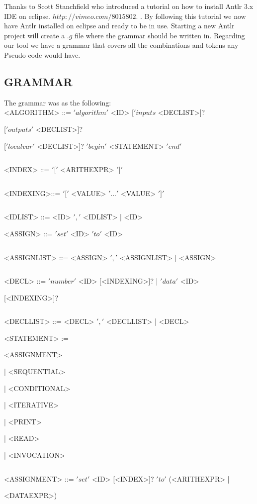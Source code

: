 \documentclass[a4paper]{article}
\begin{document}
Thanks to Scott Stanchfield who introduced a tutorial on how to install Antlr 3.x IDE on eclipse.
$ http://vimeo.com/8015802 $.  
.
By following this tutorial we now have Antlr installed on eclipse and ready to be in use.
Starting a new Antlr project will create a $.g$ file where the grammar should be written in. Regarding our tool we have a grammar that covers all the combinations and tokens any Pseudo code would have.
\subsection{GRAMMAR}
The grammar was as the following:
$$ $$
<ALGORITHM>      ::= $'algorithm' $ <ID> [$ 'inputs$ <DECLIST>]? \newline \centerline{
[$'outputs'$ <DECLIST>]?} \newline \centerline {[$'localvar'$ <DECLIST>]? $'begin'$ <STATEMENT> $'end'$ }

$$ $$

<INDEX>   ::= $'['$ <ARITHEXPR> $']'$

$$ $$

<INDEXING>::= $'['$ <VALUE> $'...'$ <VALUE> $']'$

$$ $$ 

<IDLIST> ::=  <ID> $','$ <IDLIST> | <ID>
$$ $$ 

<ASSIGN>  ::= $'set'$ <ID> $'to'$ <ID>

$$ $$

<ASSIGNLIST> ::= <ASSIGN> $','$ <ASSIGNLIST> | <ASSIGN>

$$ $$

<DECL> ::= $'number'$ <ID> [<INDEXING>]? | $ 'data' $ <ID> \newline  \centerline {[<INDEXING>]?}
\newpage
$$ $$

<DECLLIST> ::= <DECL> $','$ <DECLLIST> | <DECL>

$$ $$
<STATEMENT> := \centerline{  <ASSIGNMENT>} \newline \centerline {| <SEQUENTIAL>} \newline \centerline{ |  <CONDITIONAL> } \newline \centerline{ |  <ITERATIVE>} \newline \centerline{  | <PRINT> } \newline \centerline { | <READ>} \newline \centerline {| <INVOCATION>}


$$ $$

<ASSIGNMENT> ::= $'set'$ <ID> [<INDEX>]? $'to'$ (<ARITHEXPR> | \newline \centerline{ <DATAEXPR>)}
\end{document}
